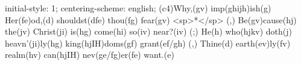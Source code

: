initial-style: 1;
centering-scheme: english;
(c4)Why,(gv) imp(ghijh)ish(g) Her(fe)od,(d) shouldst(dfe) thou(fg) fear(gv) <sp>*</sp> (,)
Be(gv)cause(hj) the(jv) Christ(ji) is(hg) come(hi) so(iv) near?(iv) (;)
He(h) who(hjkv) doth(j) heavn'(ji)ly(hg) king(hjIH)doms(gf) grant(ef/gh) (,)
Thine(d) earth(ev)ly(fv) realm(hv) can(hjIH) nev(ge/fg)er(fe) want.(e)
